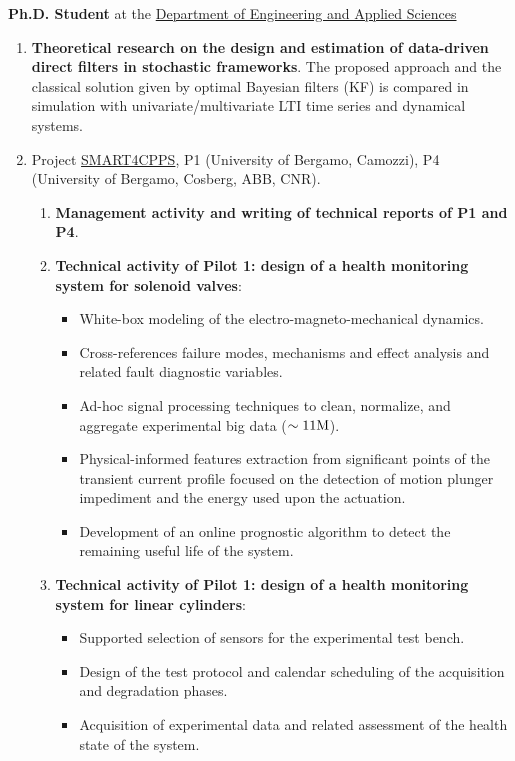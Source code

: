 \documentclass[10pt]{article}
\begin{document}
\begin{minipage}[t]{.80\textwidth}
	\textbf{Ph.D. Student} at the \href{https://disa.unibg.it/}{Department of Engineering and Applied Sciences}
	\begin{enumerate}
		\item \textbf{Theoretical research on the design and estimation of data-driven direct filters in stochastic frameworks}.
		The proposed approach and the classical solution given by optimal Bayesian filters (KF) is compared in simulation with univariate/multivariate LTI time series and dynamical systems.
		\item Project \href{https://www.smart4cpps.it/}{SMART4CPPS}, P1 ({\small University of Bergamo, Camozzi}), P4 ({\small University of Bergamo, Cosberg, ABB, CNR}).
		\begin{enumerate}
			\item \textbf{Management activity and writing of technical reports of P1 and P4}.
			\item \textbf{Technical activity of Pilot 1: design of a health monitoring system for solenoid valves}:
			\begin{itemize}
				\item White-box modeling of the electro-magneto-mechanical dynamics.
				\item Cross-references failure modes, mechanisms and effect analysis and related fault diagnostic variables.
				\item Ad-hoc signal processing techniques to clean, normalize, and aggregate experimental big data ($\sim 11 \textnormal{M}$).
				\item Physical-informed features extraction from significant points of the transient current profile focused on the detection of motion plunger impediment and the energy used upon the actuation.
				\item Development of an online prognostic algorithm to detect the remaining useful life of the system.
			\end{itemize}
			\item \textbf{Technical activity of Pilot 1: design of a health monitoring system for linear cylinders}:
			\begin{itemize}
				\item Supported selection of sensors for the experimental test bench.
				\item Design of the test protocol and calendar scheduling of the acquisition and degradation phases.
				\item Acquisition of experimental data and related assessment of the health state of the system.

\end{itemize}
\end{enumerate}
\end{enumerate}
\end{minipage}
\end{document}
